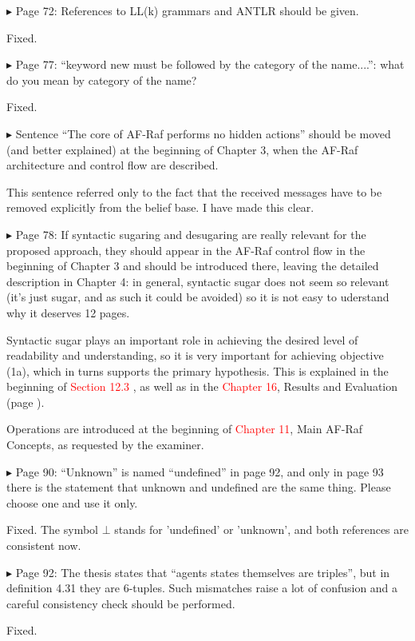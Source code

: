 \documentclass{article}
\newcommand*\R[1]{\textcolor{red}{#1}} %
\newenvironment{them}%
  {\bigskip\noindent\begingroup\color{blue}$\blacktriangleright$\enspace}%
  {\endgroup\par}
\begin{document}
\begin{them}
Page 72:
References to LL(k) grammars and ANTLR should be given.
\end{them}
Fixed.

\begin{them}
Page 77:
``keyword new must be followed by the category of the name....'': what do you
mean by category of the name?
\end{them}
Fixed.

\begin{them}
Sentence ``The core of AF-Raf performs no hidden actions'' should be moved (and
better explained) at the beginning of Chapter 3, when the AF-Raf architecture
and control flow are described.
\end{them}
This sentence referred only to the fact that the received messages have to be
removed explicitly from the belief base. I have made this clear.

\begin{them}
Page 78:
If syntactic sugaring and desugaring are really relevant for the proposed
approach, they should appear in the AF-Raf control flow in the beginning of
Chapter 3 and should be introduced there, leaving the detailed description in
Chapter 4: in general, syntactic sugar does not seem so relevant (it's just
sugar, and as such it could be avoided) so it is not easy to uderstand why it
deserves 12 pages.
\end{them}

Syntactic sugar plays an important role in achieving the desired level of
readability and understanding, so it is very important for achieving objective
(1a), which in turns supports the primary hypothesis. This is explained in the
beginning of \R{Section 12.3} , as well as in the \R{Chapter 16}, Results and
Evaluation (page ).

Operations are introduced at the beginning of \R{Chapter 11}, Main AF-Raf
Concepts, as requested by the examiner.

\begin{them}
Page 90:
``Unknown'' is named ``undefined'' in page 92, and only in page 93 there is the
statement that unknown and undefined are the same thing. Please choose one and
use it only.
\end{them}
Fixed. The symbol $\bot$ stands for 'undefined' or 'unknown', and both
references are consistent now. 

\begin{them}
Page 92:
The thesis states that ``agents states themselves are triples'', but in
definition 4.31 they are 6-tuples.  Such mismatches raise a lot of confusion
and a careful consistency check should be performed.
\end{them}
Fixed.
\end{document}
